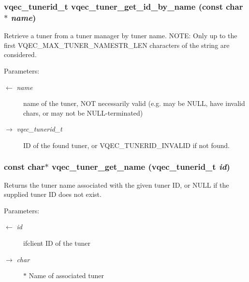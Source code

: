 \subsubsection{\setlength{\rightskip}{0pt plus 5cm}vqec\_\-tunerid\_\-t vqec\_\-tuner\_\-get\_\-id\_\-by\_\-name (const char $\ast$ {\em name})}\label{vqec__tuner_8h_8337a18b433b903ddd278633d1b03ff0}


Retrieve a tuner from a tuner manager by tuner name. NOTE: Only up to the first VQEC\_\-MAX\_\-TUNER\_\-NAMESTR\_\-LEN characters of the string are considered.

\begin{Desc}
\item[Parameters:]
\begin{description}
\item[\mbox{$\leftarrow$} {\em name}]name of the tuner, NOT necessarily valid (e.g. may be NULL, have invalid chars, or may not be NULL-terminated) \item[\mbox{$\rightarrow$} {\em vqec\_\-tunerid\_\-t}]ID of the found tuner, or VQEC\_\-TUNERID\_\-INVALID if not found. \end{description}
\end{Desc}
\subsubsection{\setlength{\rightskip}{0pt plus 5cm}const char$\ast$ vqec\_\-tuner\_\-get\_\-name (vqec\_\-tunerid\_\-t {\em id})}\label{vqec__tuner_8h_6e512982a649b387bdff78952f07f5ce}


Returns the tuner name associated with the given tuner ID, or NULL if the supplied tuner ID does not exist.

\begin{Desc}
\item[Parameters:]
\begin{description}
\item[\mbox{$\leftarrow$} {\em id}]ifclient ID of the tuner \item[\mbox{$\rightarrow$} {\em char}]$\ast$ Name of associated tuner \end{description}
\end{Desc}
